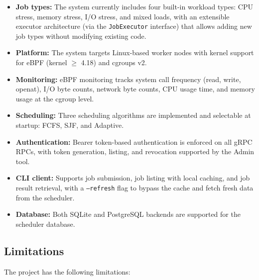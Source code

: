 \begin{itemize}
    \item \textbf{Job types:} The system currently includes four built-in workload types: CPU stress, memory stress, I/O stress, and mixed loads, with an extensible executor architecture (via the \texttt{JobExecutor} interface) that allows adding new job types without modifying existing code.
    \item \textbf{Platform:} The system targets Linux-based worker nodes with kernel support for eBPF (kernel $\geq$ 4.18) and cgroups v2.
    \item \textbf{Monitoring:} eBPF monitoring tracks system call frequency (read, write, openat), I/O byte counts, network byte counts, CPU usage time, and memory usage at the cgroup level.
    \item \textbf{Scheduling:} Three scheduling algorithms are implemented and selectable at startup: FCFS, SJF, and Adaptive.
    \item \textbf{Authentication:} Bearer token-based authentication is enforced on all gRPC RPCs, with token generation, listing, and revocation supported by the Admin tool.
    \item \textbf{CLI client:} Supports job submission, job listing with local caching, and job result retrieval, with a \texttt{--refresh} flag to bypass the cache and fetch fresh data from the scheduler.
    \item \textbf{Database:} Both SQLite and PostgreSQL backends are supported for the scheduler database.
\end{itemize}

\subsection{Limitations}

The project has the following limitations:

